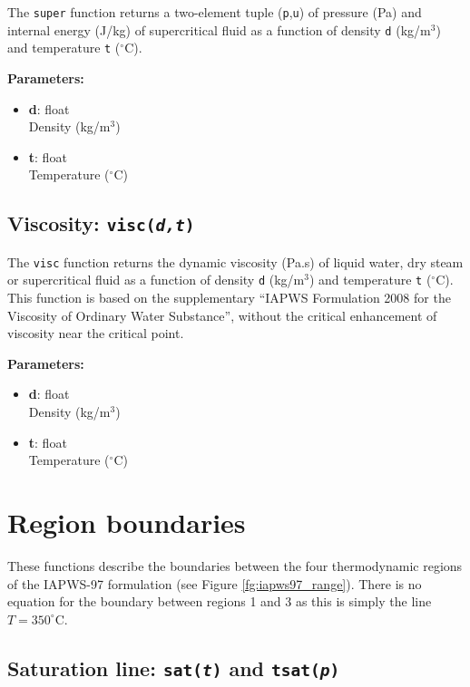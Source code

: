 The \texttt{super} function returns a two-element tuple (\texttt{p},\texttt{u}) of pressure (Pa) and internal energy (J/kg) of supercritical fluid as a function of density \texttt{d} (kg/m$^3$) and temperature \texttt{t} ($^{\circ}$C).

\textbf{Parameters:}
\begin{itemize}
\item \textbf{d}: float\\
  Density (kg/m$^3$)
\item \textbf{t}: float\\
  Temperature ($^{\circ}$C)
\end{itemize}

\begin{snugshade}
\section{Viscosity: \texttt{visc(\emph{d,t})}}
\end{snugshade}
\label{sec:iapws97:visc}

The \texttt{visc} function returns the dynamic viscosity (Pa.s) of liquid water, dry steam or supercritical fluid as a function of density \texttt{d} (kg/m$^3$) and temperature \texttt{t} ($^{\circ}$C).  This function is based on the supplementary ``IAPWS Formulation 2008 for the Viscosity of Ordinary Water Substance'', without the critical enhancement of viscosity near the critical point.

\textbf{Parameters:}
\begin{itemize}
\item \textbf{d}: float\\
  Density (kg/m$^3$)
\item \textbf{t}: float\\
  Temperature ($^{\circ}$C)
\end{itemize}

\section{Region boundaries}

These functions describe the boundaries between the four thermodynamic regions of the IAPWS-97 formulation (see Figure \ref{fg:iapws97_range}).  There is no equation for the boundary between regions 1 and 3 as this is simply the line $T = 350 ^{\circ}$C.

\subsection{Saturation line: \texttt{sat(\emph{t})} and \texttt{tsat(\emph{p})}}

